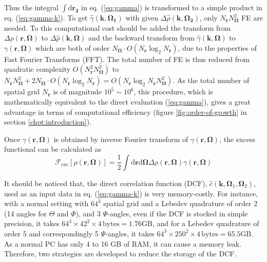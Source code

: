 Thus the integral $\int\mathrm{d}\mathbf{r_{2}}$ in eq. (\ref{eq:gamma})
is transformed to a simple product in eq. (\ref{eq:gamma-k}). To
get $\hat{\gamma}(\mathbf{k},\mathbf{\Omega_{1}})$ with given $\Delta\hat{\rho}(\mathbf{k},\mathbf{\Omega_{2}})$,
only $N_{\mathbf{r}}N_{\mathbf{\Omega}}^{2}$ FE are needed. To this
computational cost should be added the transform from $\Delta\rho(\mathbf{r},\mathbf{\Omega})$
to $\Delta\hat{\rho}(\mathbf{k},\mathbf{\Omega})$ and the backward
transform from $\hat{\gamma}(\mathbf{k},\mathbf{\Omega})$ to $\gamma(\mathbf{r},\mathbf{\Omega})$
which are both of order $N_{\mathbf{\Omega}}\cdot O(N_{\mathbf{r}}\log_{2}N_{\mathbf{r}})$,
due to the properties of Fast Fourier Transforms (FFT). The total
number of FE is thus reduced from quadratic complexity $O(N_{\mathbf{r}}^{2}N_{\mathbf{\Omega}}^{2})$
to $N_{\mathbf{r}}N_{\mathbf{\Omega}}^{2}+2N_{\mathbf{\Omega}}\cdot O(N_{\mathbf{r}}\log_{2}N_{\mathbf{r}})=O(N_{\mathbf{r}}\log_{2}N_{\mathbf{r}}N_{\mathbf{\Omega}}^{2})$.
As the total number of spatial grid $N_{\mathbf{r}}$ is of magnitude
$10^{5}\sim10^{6}$, this procedure, which is mathematically equivalent
to the direct evaluation (\ref{eq:gamma}), gives a great advantage
in terms of computational efficiency (figure \ref{fig:order-of-growth}
in section \ref{chpt:introduction}).

Once $\gamma(\mathbf{r},\mathbf{\Omega})$ is obtained by inverse
Fourier transform of $\gamma(\mathbf{r},\mathbf{\Omega})$, the excess
functional can be calculated as
\begin{equation}
\mathcal{F}_{\mathrm{exc}}[\rho(\mathbf{r},\mathbf{\Omega})]=\frac{1}{2}\int\mathrm{d}\mathbf{r}\mathrm{d}\mathbf{\Omega}\Delta\rho(\mathbf{r},\mathbf{\Omega})\gamma(\mathbf{r},\mathbf{\Omega})
\end{equation}


It should be noticed that, the direct correlation function (DCF),
$\hat{c}(\mathbf{k},\mathbf{\Omega}_{1},\mathbf{\Omega}_{2})$, used
as an input data in eq. (\ref{eq:gamma-k}) is very memory-costly.
For instance, with a normal setting with $64^{3}$ spatial grid and
a Lebedev quadrature of order 2 (14 angles for $\Theta$ and $\Phi$),
and 3 $\Psi$-angles, even if the DCF is stocked in simple precision,
it takes $64^{3}\times42^{2}\times4\,\mathrm{bytes}=1.76\mathrm{GB}$,
and for a Lebedev quadrature of order 5 and correspondingly 5 $\Psi$-angles,
it takes $64^{3}\times250^{2}\times4\,\mathrm{bytes}=65.5\mathrm{GB}$.
As a normal PC has only 4 to 16 GB of RAM, it can cause a memory leak.
Therefore, two strategies are developed to reduce the storage of the
DCF.



